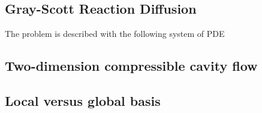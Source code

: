 \subsection{Gray-Scott Reaction Diffusion}

The problem is described with the following system of PDE

\subsection{Two-dimension compressible cavity flow}



\subsection{Local versus global basis}

